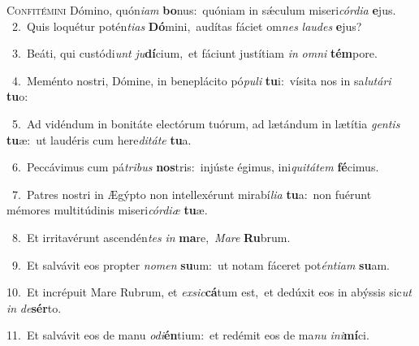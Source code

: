 \lettrine{\initial\textcolor{\initialcolor}{C}}{onfitémini} Dómino, quón\-\textit{i}\-\textit{am} \textbf{bo}\-nus:~\star quóniam in sǽculum miseri\-\textit{cór}\-\textit{di}\textit{a} \textbf{e}\-jus.\\
{\numbfont\textcolor{\numbcolor}{~2.}}~Quis loquétur potén\-\textit{ti}\-\textit{as} \textbf{Dó}\-mini,~\star audítas fáciet om\textit{nes} \textit{lau}\-\textit{des} \textbf{e}\-jus?\par
{\numbfont\textcolor{\numbcolor}{~3.}}~Beáti, qui custódi\textit{unt} \textit{ju}\-\textbf{dí}cium,~\star et fáciunt justítiam \textit{in} \textit{om}\-\textit{ni} \textbf{tém}\-pore.\par
{\numbfont\textcolor{\numbcolor}{~4.}}~Meménto nostri, Dómine, in beneplácito pó\-\textit{pu}\-\textit{li} \textbf{tu}\-i:~\star vísita nos in sa\-\textit{lu}\-\textit{tá}\textit{ri} \textbf{tu}\-o:\par
{\numbfont\textcolor{\numbcolor}{~5.}}~Ad vidéndum in bonitáte electórum tuórum, ad lætándum in lætítia \textit{gen}\-\textit{tis} \textbf{tu}\-æ:~\star ut laudéris cum here\-\textit{di}\-\textit{tá}\textit{te} \textbf{tu}\-a.\par
{\numbfont\textcolor{\numbcolor}{~6.}}~Peccávimus cum pá\-\textit{tri}\-\textit{bus} \textbf{nos}\-tris:~\star injúste égimus, ini\-\textit{qui}\-\textit{tá}\textit{tem} \textbf{fé}\-cimus.\par
{\numbfont\textcolor{\numbcolor}{~7.}}~Patres nostri in Ægýpto non intellexérunt mirabí\-\textit{li}\-\textit{a} \textbf{tu}\-a:~\star non fuérunt mémores multitúdinis miseri\-\textit{cór}\-\textit{di}\textit{æ} \textbf{tu}\-æ.\par
{\numbfont\textcolor{\numbcolor}{~8.}}~Et irritavérunt ascendén\textit{tes} \textit{in} \textbf{ma}\-re,~\star \textit{Ma}\-\textit{re} \textbf{Ru}\-brum.\par
{\numbfont\textcolor{\numbcolor}{~9.}}~Et salvávit eos propter \textit{no}\-\textit{men} \textbf{su}\-um:~\star ut notam fáceret pot\-\textit{én}\-\textit{ti}\textit{am} \textbf{su}\-am.\par
{\numbfont\textcolor{\numbcolor}{10.}}~Et incrépuit Mare Rubrum, et \textit{ex}\-\textit{sic}\textbf{cá}tum est,~\star et dedúxit eos in abýssis sic\textit{ut} \textit{in} \textit{de}\-\textbf{sér}to.\par
{\numbfont\textcolor{\numbcolor}{11.}}~Et salvávit eos de manu \textit{o}\-\textit{di}\textbf{én}tium:~\star et redémit eos de ma\textit{nu} \textit{in}\-\textit{i}\textbf{mí}ci.\par
